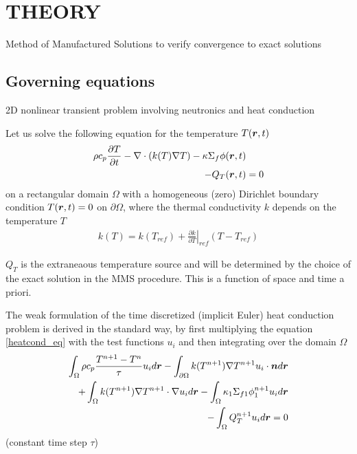 \section*{THEORY}
Method of Manufactured Solutions to verify convergence to exact solutions


\subsection*{Governing equations}
2D nonlinear transient problem involving neutronics and heat conduction

Let us solve the following equation for the temperature $T(\boldsymbol{r}, t)$
\begin{align}
  \rho c_p \frac{\partial T}{\partial t} 
  - \nabla\cdot(k(T) \nabla T) 
  - \kappa \Sigma_{f} \phi(\boldsymbol{r},t)&  \nonumber \\
  - Q_T(\boldsymbol{r},t) &= 0 \label{heatcond_eq}
\end{align}
on a rectangular domain $\Omega$ with a homogeneous (zero) Dirichlet boundary condition $T(\boldsymbol{r},t) = 0$ on $\partial\Omega$, where the thermal conductivity $k$ depends on the temperature $T$
\begin{align}
  k(T) = k(T_{ref}) + \left. \frac{\partial k}{\partial T}\right|_{ref} \left( T - T_{ref} \right)
\end{align}

$Q_T$ is the extraneaous temperature source and will be determined by the choice of the exact solution in the MMS procedure.  This is a function of space and time a priori.

The weak formulation of the time discretized (implicit Euler) heat conduction problem is derived in the standard way, by first multiplying the equation \eqref{heatcond_eq} with the test functions $u_{i}$ and then integrating over the domain $\Omega$
\begin{align}
  \int_{\Omega} \rho c_p \frac{T^{n+1}-T{^n}}{\tau} u_i d\boldsymbol{r} 
  - \int_{\partial\Omega} k(T^{n+1}) \nabla T^{n+1} u_i \cdot \boldsymbol{n} d\boldsymbol{r}&  \nonumber \\
  + \int_{\Omega} k(T^{n+1}) \nabla T^{n+1} \cdot \nabla u_i d\boldsymbol{r}
  - \int_{\Omega} \kappa_1 \Sigma_{f1} \phi_1^{n+1} u_i d\boldsymbol{r}& \nonumber \\
  - \int_{\Omega} Q_T^{n+1} u_i d\boldsymbol{r} = 0& \label{heatcond_wf}
\end{align}
(constant time step $\tau$)

